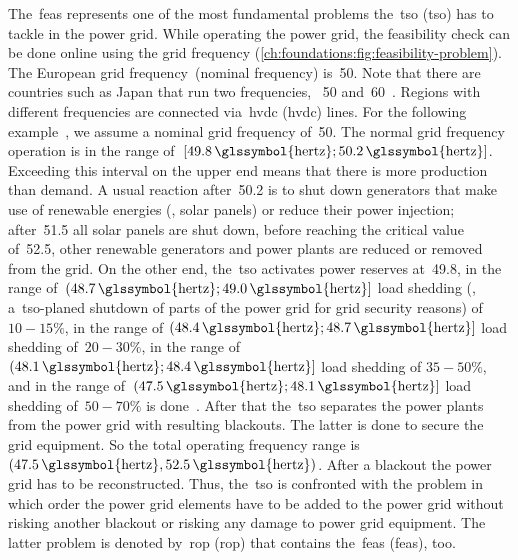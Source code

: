 The~\acrlong{feas} represents one of the most fundamental problems
the~\acrlong{tso} (\gls{tso}) has to tackle in the power grid. While operating
the power grid, the feasibility check can be done online using the grid
frequency (\cref{ch:foundations:fig:feasibility-problem}). The
European grid frequency~\frequency (nominal frequency)
is~\SI{50}{}. Note that there are countries such as Japan that
run two frequencies, \ie~\SI{50}{
}
and~\SI{60}{}~\parencite{online:japans-incompatible-power-grid}.
Regions with different frequencies are connected via~\acrlong{hvdc} (\gls{hvdc})
lines. For the following example~\parencite{online:gridFrequency}, we assume a
nominal grid frequency of~\SI{50}{}. The normal grid frequency
operation is in the range 
of~$[\SI{49.8}{\glssymbol{hertz}};\SI{50.2}{\glssymbol{hertz}}]$. Exceeding this
interval on the upper end means that there is more production than demand. A
usual reaction after~\SI{50.2}{} is to shut down generators
that make use of renewable energies (\ie, solar panels) or reduce their power
injection; after~\SI{51.5}{} all solar panels are shut down,
before reaching the critical value of~\SI{52.5}{}, other
renewable generators and power plants are reduced or removed from the grid. On
the other end, the~\gls{tso} activates power reserves
at~\SI{49.8}{}, in the range
of~$(\SI{48.7}{\glssymbol{hertz}};\SI{49.0}{\glssymbol{hertz}}]$ load shedding
(\ie, a~\acrshort{tso}-planed shutdown of parts of the power grid for grid
security reasons) of~$10-15\%$, in the range of
$(\SI{48.4}{\glssymbol{hertz}};\SI{48.7}{\glssymbol{hertz}}]$ load shedding
of~$20-30\%$, in the range of
$(\SI{48.1}{\glssymbol{hertz}};\SI{48.4}{\glssymbol{hertz}}]$ load shedding of
$35-50\%$, and in the range of~$(\SI{47.5}{\glssymbol{hertz}};\SI{48.1}{
\glssymbol{hertz}}]$ load shedding of~$50-70\%$ is
done~\parencite{online:gridFrequency}. After that the~\gls{tso} separates the
power plants from the power grid with resulting blackouts. The latter is done to
secure the grid equipment. So the total operating frequency range
is~$(\SI{47.5}{\glssymbol{hertz}},\SI{52.5}{\glssymbol{hertz}})$. After a
blackout the power grid has to be reconstructed. Thus, the~\gls{tso} is
confronted with the problem in which order the power grid elements have to be
added to the power grid without risking another blackout or risking any damage
to power grid equipment. The latter problem is denoted by~\acrlong{rop}
(\gls{rop}) that contains the~\acrlong{feas} (\gls{feas}), too.
